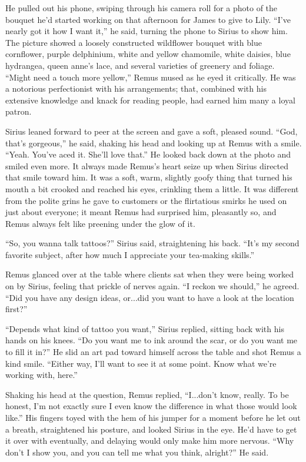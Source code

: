 He pulled out his phone, swiping through his camera roll for a photo of the bouquet he’d started working on that afternoon for James to give to Lily. “I’ve nearly got it how I want it,” he said, turning the phone to Sirius to show him. The picture showed a loosely constructed wildflower bouquet with blue cornflower, purple delphinium, white and yellow chamomile, white daisies, blue hydrangea, queen anne's lace, and several varieties of greenery and foliage. “Might need a touch more yellow,” Remus mused as he eyed it critically. He was a notorious perfectionist with his arrangements; that, combined with his extensive knowledge and knack for reading people, had earned him many a loyal patron.

Sirius leaned forward to peer at the screen and gave a soft, pleased sound. “God, that’s gorgeous,” he said, shaking his head and looking up at Remus with a smile. “Yeah. You’ve aced it. She’ll love that.” He looked back down at the photo and smiled even more. It always made Remus's heart seize up when Sirius directed that smile toward him. It was a soft, warm, slightly goofy thing that turned his mouth a bit crooked and reached his eyes, crinkling them a little. It was different from the polite grins he gave to customers or the flirtatious smirks he used on just about everyone; it meant Remus had surprised him, pleasantly so, and Remus always felt like preening under the glow of it.

“So, you wanna talk tattoos?” Sirius said, straightening his back. “It's my second favorite subject, after how much I appreciate your tea-making skills.”

Remus glanced over at the table where clients sat when they were being worked on by Sirius, feeling that prickle of nerves again. “I reckon we should,” he agreed. “Did you have any design ideas, or...did you want to have a look at the location first?”

“Depends what kind of tattoo you want,” Sirius replied, sitting back with his hands on his knees. “Do you want me to ink around the scar, or do you want me to fill it in?” He slid an art pad toward himself across the table and shot Remus a kind smile. “Either way, I’ll want to see it at some point. Know what we’re working with, here.”

Shaking his head at the question, Remus replied, “I...don't know, really. To be honest, I’m not exactly sure I even know the difference in what those would look like.” His fingers toyed with the hem of his jumper for a moment before he let out a breath, straightened his posture, and looked Sirius in the eye. He’d have to get it over with eventually, and delaying would only make him more nervous. “Why don’t I show you, and you can tell me what you think, alright?” He said.

